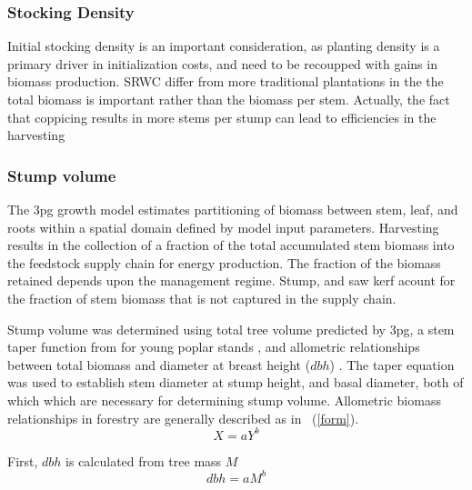 \documentclass[10pt]{article}
\begin{document}

\subsubsection*{Stocking Density}
\label{sec:stocking-density}

Initial stocking density is an important consideration, as planting
density is a primary driver in initialization costs, and need to be
recoupped with gains in biomass production.  \ac{SRWC} differ from
more traditional plantations in the the total biomass is important
rather than the biomass per stem.  Actually, the fact that coppicing
results in more stems per stump can lead to efficiencies in the
harvesting 

\subsubsection*{Stump volume}
\label{sec:stump-volume}

The \ac{3pg} growth model estimates partitioning of biomass between stem,
leaf, and roots within a spatial domain defined by model input
parameters. Harvesting results in the collection of a fraction of the
total accumulated stem biomass into the feedstock supply chain for
energy production. The fraction of the biomass retained depends upon
the management regime. Stump, and saw kerf acount for the fraction of
stem biomass that is not captured in the supply chain.

Stump volume was determined using total tree volume predicted by \ac{3pg},
a stem taper function from for young poplar stands
\cite{Benbrahim2003} , and allometric relationships between total
biomass and diameter at breast height ($dbh$) \cite{Brahim2000}. The
taper equation was used to establish stem diameter at stump height,
and basal diameter, both of which which are necessary for determining
stump volume. Allometric biomass relationships in forestry are
generally described as in ~(\ref{form}).
\begin{equation}
  \label{eq:form}
  X=aY^b
\end{equation}

First, $dbh$ is calculated from tree mass $M$
\begin{equation}
    \label{eqn:dbh}
    dbh=aM^b
    \end{equation}
\end{document}
